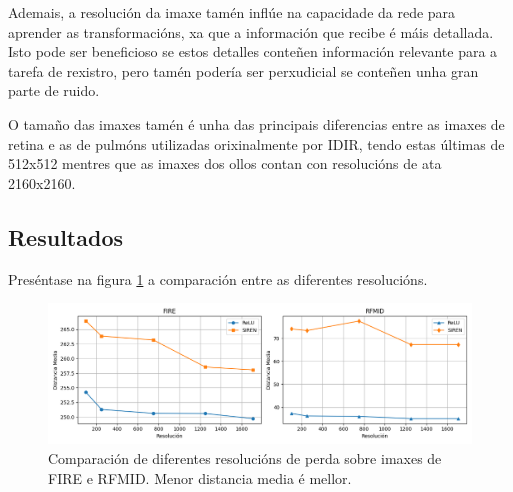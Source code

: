 Ademais, a resolución da imaxe tamén inflúe na capacidade da rede para aprender as transformacións, xa que a información que recibe é máis detallada. 
Isto pode ser beneficioso se estos detalles conteñen información relevante para a tarefa de rexistro, pero tamén podería ser perxudicial se conteñen unha gran parte de ruido.

O tamaño das imaxes tamén é unha das principais diferencias entre as imaxes de retina e as de pulmóns utilizadas orixinalmente por IDIR, tendo estas últimas de 512x512 mentres que as imaxes dos ollos contan con resolucións de ata 2160x2160.

\subsection{Resultados}
\label{subsec:Resultados-resolution}

Preséntase na figura \ref{fig:resoluciónchart} a comparación entre as diferentes resolucións.

\begin{figure}[tbp]
    \centering
    \includegraphics[width=1\textwidth]{imaxes/resolutionchart.png}
    \caption{Comparación de diferentes resolucións de perda sobre imaxes de FIRE e RFMID. Menor distancia media é mellor.}
    \label{fig:resoluciónchart}
\end{figure}


